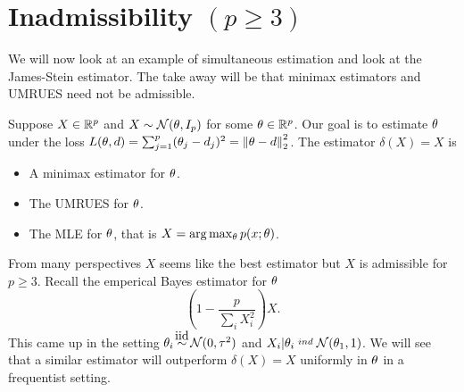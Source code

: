 \section{Inadmissibility $(p \ge 3)$}
We will now look at an example of simultaneous estimation and look at the James-Stein estimator. The take away will be that minimax estimators and UMRUES need not be admissible.

Suppose $X\in {\mathbb R}^p$ and $X \sim {{\mathcal{N}}}({\theta}, I_p)$ for some ${\theta} \in {\mathbb R}^p$. Our goal is to estimate ${\theta}$ under the loss $L({\theta},d) = \sum_{j=1}^p ({\theta}_j-d_j)^2 = \left\|{\theta}-d\right\|_2^2$. The estimator $\delta(X) =X$ is
\begin{itemize}
    \item A minimax estimator for ${\theta}$.
    \item The UMRUES for ${\theta}$.
    \item The MLE for ${\theta}$, that is $X = \arg\max_{\theta} p(x;{\theta})$.
\end{itemize}
From many perspectives $X$ seems like the best estimator but $X$ is admissible for $p \ge 3$. Recall the emperical Bayes estimator for ${\theta}$
\[\left(1-\frac{p}{\sum_i X_i^2}\right)X. \]
This came up in the setting $\ta_i \iid \Na(0,\tau^2)$ and $X_i|{\theta}_i \stackrel{ind}{~} {{\mathcal{N}}}({\theta}_1,1)$. We will see that a similar estimator will outperform $\delta(X)=X$ uniformly in ${\theta}$ in a frequentist setting. 

